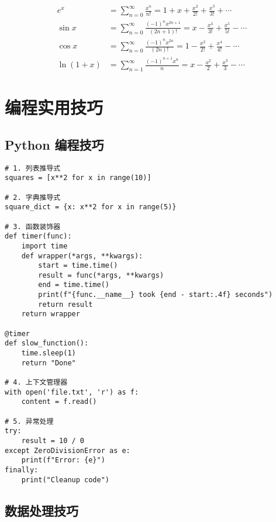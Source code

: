 \begin{definitionbox}[title=常用级数展开]
\begin{align}
e^x &= \sum_{n=0}^{\infty} \frac{x^n}{n!} = 1 + x + \frac{x^2}{2!} + \frac{x^3}{3!} + \cdots \\
\sin x &= \sum_{n=0}^{\infty} \frac{(-1)^n x^{2n+1}}{(2n+1)!} = x - \frac{x^3}{3!} + \frac{x^5}{5!} - \cdots \\
\cos x &= \sum_{n=0}^{\infty} \frac{(-1)^n x^{2n}}{(2n)!} = 1 - \frac{x^2}{2!} + \frac{x^4}{4!} - \cdots \\
\ln(1+x) &= \sum_{n=1}^{\infty} \frac{(-1)^{n+1} x^n}{n} = x - \frac{x^2}{2} + \frac{x^3}{3} - \cdots
\end{align}
\end{definitionbox}

\section{编程实用技巧}\label{app:programming-tips}

\subsection{Python 编程技巧}

\begin{codebox}[title=Python 常用技巧]
\begin{verbatim}
# 1. 列表推导式
squares = [x**2 for x in range(10)]

# 2. 字典推导式
square_dict = {x: x**2 for x in range(5)}

# 3. 函数装饰器
def timer(func):
    import time
    def wrapper(*args, **kwargs):
        start = time.time()
        result = func(*args, **kwargs)
        end = time.time()
        print(f"{func.__name__} took {end - start:.4f} seconds")
        return result
    return wrapper

@timer
def slow_function():
    time.sleep(1)
    return "Done"

# 4. 上下文管理器
with open('file.txt', 'r') as f:
    content = f.read()

# 5. 异常处理
try:
    result = 10 / 0
except ZeroDivisionError as e:
    print(f"Error: {e}")
finally:
    print("Cleanup code")
\end{verbatim}
\end{codebox}

\subsection{数据处理技巧}

